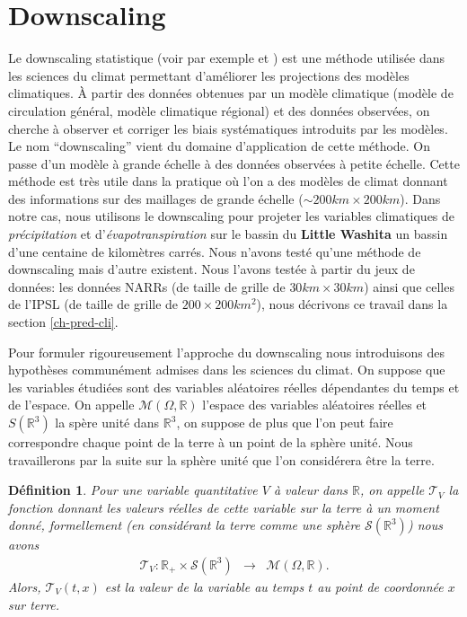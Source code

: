 \documentclass[a4paper,11pt]{article}
\newtheorem{definition}{Définition}
\begin{document}
\section{Downscaling}
\label{downscaling}
Le downscaling statistique (voir par exemple \cite{vrac2012dynamical} et \cite{ayar2016intercomparison}) est une méthode utilisée dans les sciences du climat permettant d'améliorer les projections des modèles climatiques. À partir des données obtenues par un modèle climatique (modèle de circulation général, modèle climatique régional) et des données observées, on cherche à observer et corriger les biais systématiques introduits par les modèles. Le nom ``downscaling'' vient du domaine d'application de cette méthode. On passe d'un modèle à grande échelle à des données observées à petite échelle. Cette méthode est très utile dans la pratique où l'on a des modèles de climat donnant des informations sur des maillages de grande échelle ($\sim 200km\times 200km$). Dans notre cas, nous utilisons le downscaling pour projeter les variables climatiques de \textit{précipitation} et d'\textit{évapotranspiration} sur le bassin du \textbf{Little Washita} un bassin d'une centaine de kilomètres carrés. Nous n'avons testé qu'une méthode de downscaling mais d'autre existent. Nous l'avons testée à partir du jeux de données: les données NARRs (de taille de grille de $30km\times 30 km$) ainsi que celles de l'IPSL (de taille de grille de $200\times200 km^2$), nous décrivons ce travail dans la section \ref{ch-pred-cli}.

Pour formuler rigoureusement l'approche du downscaling nous introduisons des hypothèses communément admises dans les sciences du climat. On suppose que les variables étudiées sont des variables aléatoires réelles dépendantes du temps et de l'espace. On appelle $\mathcal{M}(\Omega,\mathbb{R})$ l'espace des variables aléatoires réelles et $S(\mathbb{R}^3)$ la spère unité dans $\mathbb{R}^3$, on suppose de plus que l'on peut faire correspondre chaque point de la terre à un point de la sphère unité. Nous travaillerons par la suite sur la sphère unité que l'on considérera être la terre.

\begin{definition}
	\label{terre}
	Pour une variable quantitative $V$ à valeur dans $\mathbb{R}$, on appelle $\mathcal{T}_V$ la fonction donnant les  valeurs réelles de cette variable sur la terre à un moment donné, formellement (en considérant la terre comme une sphère $\mathcal{S}(\mathbb{R}^3)$) nous avons
	\begin{equation}
		\begin{array}{ccc}
			\mathcal{T}_V: \mathbb{R}_{+}\times\mathcal{S}(\mathbb{R}^{3}) & \to & \mathcal{M}(\Omega,\mathbb{R}).
		\end{array}
	\end{equation}
	Alors, $\mathcal{T}_V(t,x)$ est la valeur de la variable au temps $t$ au point de coordonnée $x$ sur terre.	
\end{definition}
\end{document}
